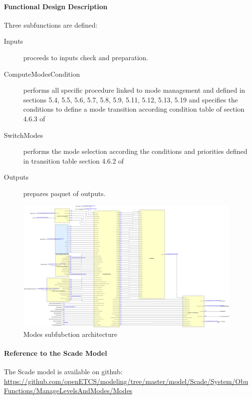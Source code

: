 \paragraph{Functional Design Description}


Three subfunctions are defined:
\begin{description}
\item[Inputs] proceeds to inputs check and preparation.
\item[ComputeModesCondition] performs all specific procedure linked to mode management and defined in  \citep{subset-026} sections 5.4, 5.5, 5.6, 5.7, 5.8, 5.9, 5.11, 5.12, 5.13, 5.19 and specifies the conditions to define a mode transition according condition table of section 4.6.3 of \citep{subset-026}
\item[SwitchModes] performs the mode selection according the conditions and priorities defined in transition table  section 4.6.2 of \citep{subset-026}
\item[Outputs] prepares paquet of outputs.
\end{description}


\begin{landscape}
\begin{figure}[hbtp]
\centering
\includegraphics[scale=0.3]{images/ManageModes.png}
\caption{Modes subfubction architecture}
\end{figure}
\end{landscape}

\paragraph{Reference to the Scade Model}
The Scade model is available on github:
\url{https://github.com/openETCS/modeling/tree/master/model/Scade/System/ObuFunctions/ManageLevelsAndModes/Modes}

